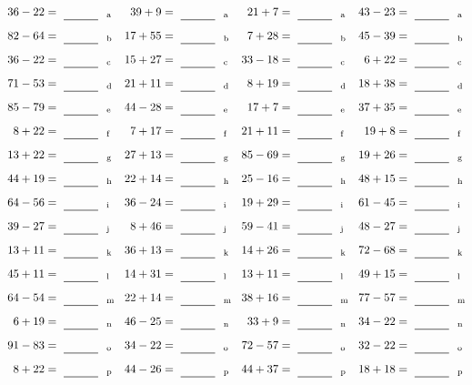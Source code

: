 \documentclass
[
  draft    = true,
  fontsize = 11pt,
  parskip  = half-
]
{scrartcl}
\begin{document}
\clearpage
\begin{align*}
    \pline{36-22}&=\rline{a}
  & \pline{39+9}&=\rline{a}
  & \pline{21+7}&=\rline{a}
  & \pline{43-23}&=\rline{a} \\[1ex]
    \pline{82-64}&=\rline{b}
  & \pline{17+55}&=\rline{b}
  & \pline{7+28}&=\rline{b}
  & \pline{45-39}&=\rline{b} \\[1ex]
    \pline{36-22}&=\rline{c}
  & \pline{15+27}&=\rline{c}
  & \pline{33-18}&=\rline{c}
  & \pline{6+22}&=\rline{c} \\[1ex]
    \pline{71-53}&=\rline{d}
  & \pline{21+11}&=\rline{d}
  & \pline{8+19}&=\rline{d}
  & \pline{18+38}&=\rline{d} \\[1ex]
    \pline{85-79}&=\rline{e}
  & \pline{44-28}&=\rline{e}
  & \pline{17+7}&=\rline{e}
  & \pline{37+35}&=\rline{e} \\[1ex]
    \pline{8+22}&=\rline{f}
  & \pline{7+17}&=\rline{f}
  & \pline{21+11}&=\rline{f}
  & \pline{19+8}&=\rline{f} \\[1ex]
    \pline{13+22}&=\rline{g}
  & \pline{27+13}&=\rline{g}
  & \pline{85-69}&=\rline{g}
  & \pline{19+26}&=\rline{g} \\[1ex]
    \pline{44+19}&=\rline{h}
  & \pline{22+14}&=\rline{h}
  & \pline{25-16}&=\rline{h}
  & \pline{48+15}&=\rline{h} \\[1ex]
    \pline{64-56}&=\rline{i}
  & \pline{36-24}&=\rline{i}
  & \pline{19+29}&=\rline{i}
  & \pline{61-45}&=\rline{i} \\[1ex]
    \pline{39-27}&=\rline{j}
  & \pline{8+46}&=\rline{j}
  & \pline{59-41}&=\rline{j}
  & \pline{48-27}&=\rline{j} \\[1ex]
    \pline{13+11}&=\rline{k}
  & \pline{36+13}&=\rline{k}
  & \pline{14+26}&=\rline{k}
  & \pline{72-68}&=\rline{k} \\[1ex]
    \pline{45+11}&=\rline{l}
  & \pline{14+31}&=\rline{l}
  & \pline{13+11}&=\rline{l}
  & \pline{49+15}&=\rline{l} \\[1ex]
    \pline{64-54}&=\rline{m}
  & \pline{22+14}&=\rline{m}
  & \pline{38+16}&=\rline{m}
  & \pline{77-57}&=\rline{m} \\[1ex]
    \pline{6+19}&=\rline{n}
  & \pline{46-25}&=\rline{n}
  & \pline{33+9}&=\rline{n}
  & \pline{34-22}&=\rline{n} \\[1ex]
    \pline{91-83}&=\rline{o}
  & \pline{34-22}&=\rline{o}
  & \pline{72-57}&=\rline{o}
  & \pline{32-22}&=\rline{o} \\[1ex]
    \pline{8+22}&=\rline{p}
  & \pline{44-26}&=\rline{p}
  & \pline{44+37}&=\rline{p}
  & \pline{18+18}&=\rline{p}
\end{align*}
\end{document}
